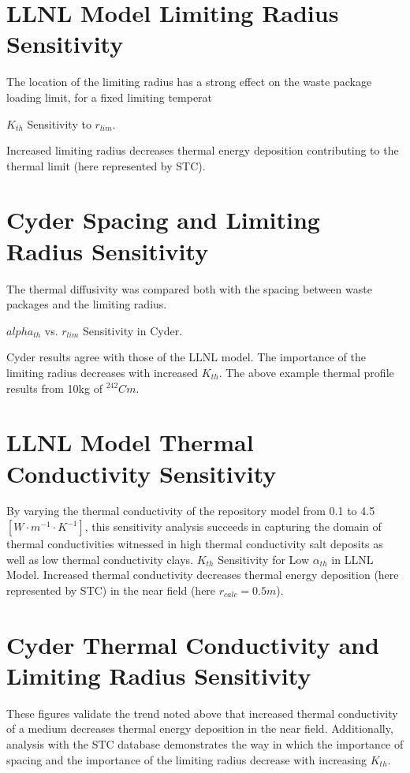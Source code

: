 \documentclass[letterpaper]{article}
\begin{document}
\begin{frame}[ctb!]
\section*{LLNL Model Limiting Radius Sensitivity}
  The location of the limiting radius has a strong effect on the 
  waste package loading limit, for a fixed limiting temperat
  
  $K_{th}$ Sensitivity to $r_{lim}$.
  
  Increased limiting radius decreases thermal energy deposition contributing to 
  the thermal limit (here represented by STC).

\section*{Cyder Spacing and Limiting Radius Sensitivity}
  The thermal diffusivity was compared both with the 
  spacing between waste packages and the limiting radius. 

  $alpha_{th}$ vs. $r_{lim}$ Sensitivity in Cyder.

  Cyder results agree with those of the LLNL model. The importance of the 
  limiting radius decreases with increased $K_{th}$. The above example thermal 
  profile results from 10kg of $^{242}Cm$.

\section*{LLNL Model Thermal Conductivity Sensitivity}
By varying the thermal conductivity of the repository model from 0.1 to 4.5 
$[W\cdot m^{-1} \cdot K^{-1}]$, this sensitivity analysis succeeds in capturing 
the domain of thermal conductivities witnessed in high thermal conductivity 
salt deposits as well as low thermal conductivity clays.
$K_{th}$ Sensitivity for Low $\alpha_{th}$ in LLNL Model.
Increased thermal conductivity decreases thermal energy deposition 
(here represented by STC) in the near field (here $r_{calc} = 0.5m$).

\section*{Cyder Thermal Conductivity and Limiting Radius Sensitivity}

These figures validate the trend noted above that 
increased thermal conductivity of a medium decreases thermal energy deposition 
in the near field. Additionally, analysis with the \Cyder STC database 
demonstrates the way in which the importance of spacing and the importance of 
the limiting radius decrease with increasing $K_{th}$.


\end{frame}
\end{document}
